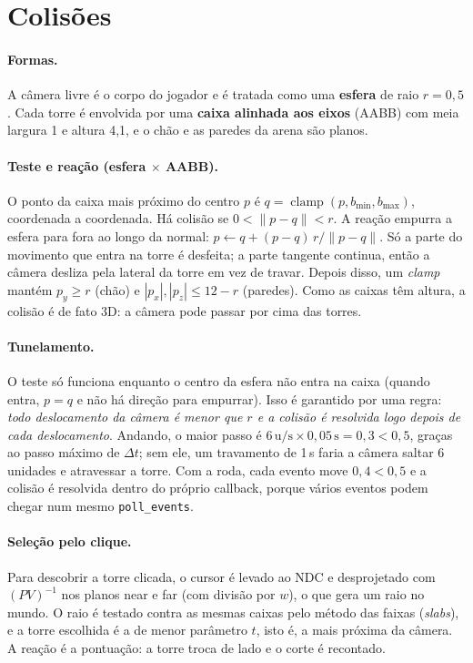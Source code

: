 \documentclass[a4paper,11pt]{article}
\begin{document}
\section{Colisões}
\paragraph{Formas.} A câmera livre é o corpo do jogador e é tratada como uma
\textbf{esfera} de raio $r=0{,}5$. Cada torre é envolvida por uma \textbf{caixa
alinhada aos eixos} (AABB) com meia largura 1 e altura 4,1, e o chão e as
paredes da arena são planos.

\paragraph{Teste e reação (esfera $\times$ AABB).} O ponto da caixa mais
próximo do centro $p$ é $q = \operatorname{clamp}(p, b_{\min}, b_{\max})$,
coordenada a coordenada. Há colisão se $0 < \lVert p-q\rVert < r$. A reação
empurra a esfera para fora ao longo da normal:
$p \leftarrow q + (p-q)\,r/\lVert p-q\rVert$. Só a parte do movimento que entra
na torre é desfeita; a parte tangente continua, então a câmera desliza pela
lateral da torre em vez de travar. Depois disso, um \emph{clamp} mantém
$p_y \ge r$ (chão) e $|p_x|,|p_z| \le 12-r$ (paredes). Como as caixas têm
altura, a colisão é de fato 3D: a câmera pode passar por cima das torres.

\paragraph{Tunelamento.} O teste só funciona enquanto o centro da esfera não
entra na caixa (quando entra, $p=q$ e não há direção para empurrar). Isso é
garantido por uma regra: \emph{todo deslocamento da câmera é menor que $r$ e a
colisão é resolvida logo depois de cada deslocamento}. Andando, o maior passo
é $6\,\text{u/s} \times 0{,}05\,\text{s} = 0{,}3 < 0{,}5$, graças ao passo
máximo de $\Delta t$; sem ele, um travamento de 1\,s faria a câmera saltar 6
unidades e atravessar a torre. Com a roda, cada evento move $0{,}4 < 0{,}5$ e a
colisão é resolvida dentro do próprio callback, porque vários eventos podem
chegar num mesmo \texttt{poll\_events}.

\paragraph{Seleção pelo clique.} Para descobrir a torre clicada, o cursor é
levado ao NDC e desprojetado com $(PV)^{-1}$ nos planos near e far (com divisão
por $w$), o que gera um raio no mundo. O raio é testado contra as mesmas caixas
pelo método das faixas (\emph{slabs}), e a torre escolhida é a de menor
parâmetro $t$, isto é, a mais próxima da câmera. A reação é a pontuação: a torre
troca de lado e o corte é recontado.
\end{document}
